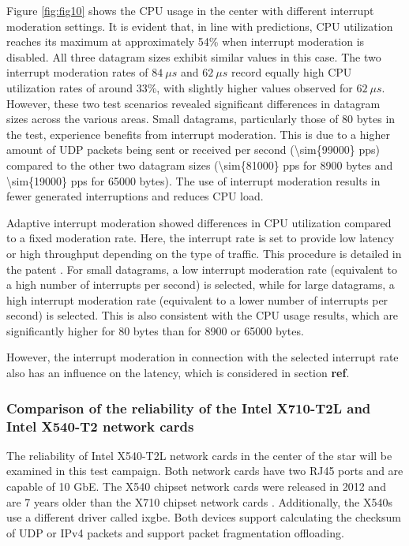 \documentclass[11pt]{article}
\begin{document}
Figure \ref{fig:fig10} shows the CPU usage in the center with different interrupt moderation settings. It is evident that, in line with predictions, CPU utilization reaches its maximum at approximately 54\% when interrupt moderation is disabled. All three datagram sizes exhibit similar values in this case. The two interrupt moderation rates of \( 84\ \mu s \) and \( 62\ \mu s \) record equally high CPU utilization rates of around 33\%, with slightly higher values observed for \( 62\ \mu s \). However, these two test scenarios revealed significant differences in datagram sizes across the various areas. Small datagrams, particularly those of 80 bytes in the test, experience benefits from interrupt moderation. This is due to a higher amount of UDP packets being sent or received per second (\num{\sim{99000}} pps) compared to the other two datagram sizes (\num{\sim{81000}} pps for 8900 bytes and \num{\sim{19000}} pps for 65000 bytes). The use of interrupt moderation results in fewer generated interruptions and reduces CPU load.

Adaptive interrupt moderation showed differences in CPU utilization compared to a fixed moderation rate. Here, the interrupt rate is set to provide low latency or high throughput depending on the type of traffic. This procedure is detailed in the patent \cite{tbd}. For small datagrams, a low interrupt moderation rate (equivalent to a high number of interrupts per second) is selected, while for large datagrams, a high interrupt moderation rate (equivalent to a lower number of interrupts per second) is selected. This is also consistent with the CPU usage results, which are significantly higher for 80 bytes than for 8900 or 65000 bytes.

However, the interrupt moderation in connection with the selected interrupt rate also has an influence on the latency, which is considered in section \textbf{ref}.


\subsubsection{Comparison of the reliability of the Intel X710-T2L and Intel X540-T2 network cards}

The reliability of Intel X540-T2L network cards in the center of the star will be examined in this test campaign. Both network cards have two RJ45 ports and are capable of 10 GbE. The X540 chipset network cards were released in 2012 and are 7 years older than the X710 chipset network cards \cite{tbd}\cite{tbd}. Additionally, the X540s use a different driver called ixgbe. Both devices support calculating the checksum of UDP or IPv4 packets and support packet fragmentation offloading.
\end{document}
